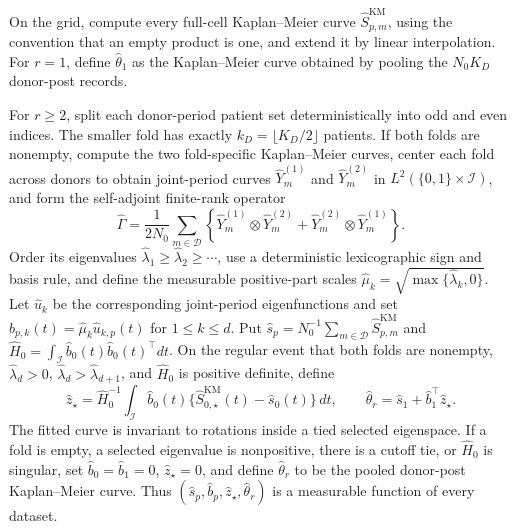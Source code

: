 On the grid, compute every full-cell Kaplan--Meier curve \(\widehat S^{\mathrm{KM}}_{p,m}\), using the convention that an empty product is one, and extend it by linear interpolation.  For \(r=1\), define \(\widehat\theta_1\) as the Kaplan--Meier curve obtained by pooling the \(N_0K_D\) donor-post records.

For \(r\ge2\), split each donor-period patient set deterministically into odd and even indices.  The smaller fold has exactly \(k_D=\lfloor K_D/2\rfloor\) patients.  If both folds are nonempty, compute the two fold-specific Kaplan--Meier curves, center each fold across donors to obtain joint-period curves \(\widehat Y_m^{(1)}\) and \(\widehat Y_m^{(2)}\) in \(L^2(\{0,1\}\times\mathcal I)\), and form the self-adjoint finite-rank operator
\[
 \widehat\Gamma=\frac{1}{2N_0}\sum_{m\in\mathcal D}
 \left\{\widehat Y_m^{(1)}\otimes\widehat Y_m^{(2)}+
 \widehat Y_m^{(2)}\otimes\widehat Y_m^{(1)}\right\}.
\]
Order its eigenvalues \(\widehat\lambda_1\ge\widehat\lambda_2\ge\cdots\), use a deterministic lexicographic sign and basis rule, and define the measurable positive-part scales \(\widehat\mu_k=\sqrt{\max\{\widehat\lambda_k,0\}}\).  Let \(\widehat u_k\) be the corresponding joint-period eigenfunctions and set \(\widehat b_{p,k}(t)=\widehat\mu_k\widehat u_{k,p}(t)\) for \(1\le k\le d\).  Put \(\widehat s_p=N_0^{-1}\sum_{m\in\mathcal D}\widehat S^{\mathrm{KM}}_{p,m}\) and \(\widehat H_0=\int_{\mathcal I}\widehat b_0(t)\widehat b_0(t)^\top dt\).  On the regular event that both folds are nonempty, \(\widehat\lambda_d>0\), \(\widehat\lambda_d>\widehat\lambda_{d+1}\), and \(\widehat H_0\) is positive definite, define
\[
 \widehat z_\star=\widehat H_0^{-1}\int_{\mathcal I}\widehat b_0(t)
 \{\widehat S^{\mathrm{KM}}_{0,\star}(t)-\widehat s_0(t)\}\,dt,
 \qquad
 \widehat\theta_r=\widehat s_1+\widehat b_1^\top\widehat z_\star.
\]
The fitted curve is invariant to rotations inside a tied selected eigenspace.  If a fold is empty, a selected eigenvalue is nonpositive, there is a cutoff tie, or \(\widehat H_0\) is singular, set \(\widehat b_0=\widehat b_1=0\), \(\widehat z_\star=0\), and define \(\widehat\theta_r\) to be the pooled donor-post Kaplan--Meier curve.  Thus \((\widehat s_p,\widehat b_p,\widehat z_\star,\widehat\theta_r)\) is a measurable function of every dataset.

